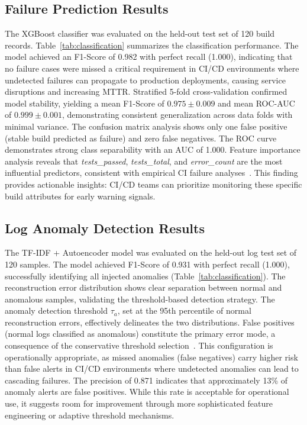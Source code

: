 \documentclass[sn-nature]{sn-jnl}
\theoremstyle{thmstyleone}
\theoremstyle{thmstyletwo}
\theoremstyle{thmstylethree}
\begin{document}
\subsection{Failure Prediction Results}\label{subsec:failureresults}

The XGBoost classifier was evaluated on the held-out test set of 120 build records.
Table~\ref{tab:classification} summarizes the classification performance. The model achieved an F1-Score of 0.982 with perfect recall (1.000), indicating that no failure cases were missed a critical requirement in CI/CD environments where undetected failures can propagate to production deployments, causing service disruptions and increasing MTTR.
Stratified 5-fold cross-validation confirmed model stability, yielding a mean F1-Score of $0.975 \pm 0.009$ and mean ROC-AUC of $0.999 \pm 0.001$, demonstrating consistent generalization across data folds with minimal variance.
The confusion matrix analysis shows only one false positive (stable build predicted as failure) and zero false negatives.
The ROC curve demonstrates strong class separability with an AUC of 1.000.
Feature importance analysis reveals that \textit{tests\_passed}, \textit{tests\_total}, and \textit{error\_count} are the most influential predictors, consistent with empirical CI failure analyses~\cite{rausch2017empirical}.
This finding provides actionable insights: CI/CD teams can prioritize monitoring these specific build attributes for early warning signals.

\subsection{Log Anomaly Detection Results}\label{subsec:anomalyresults}

The TF-IDF + Autoencoder model was evaluated on the held-out log test set of 120 samples.
The model achieved F1-Score of 0.931 with perfect recall (1.000), successfully identifying all injected anomalies (Table~\ref{tab:classification}).
The reconstruction error distribution shows clear separation between normal and anomalous samples, validating the threshold-based detection strategy.
The anomaly detection threshold $\tau_a$, set at the 95th percentile of normal reconstruction errors, effectively delineates the two distributions.
False positives (normal logs classified as anomalous) constitute the primary error mode, a consequence of the conservative threshold selection~\cite{sakurada2014anomaly}.
This configuration is operationally appropriate, as missed anomalies (false negatives) carry higher risk than false alerts in CI/CD environments where undetected anomalies can lead to cascading failures.
The precision of 0.871 indicates that approximately 13\% of anomaly alerts are false positives.
While this rate is acceptable for operational use, it suggests room for improvement through more sophisticated feature engineering or adaptive threshold mechanisms.
\end{document}

